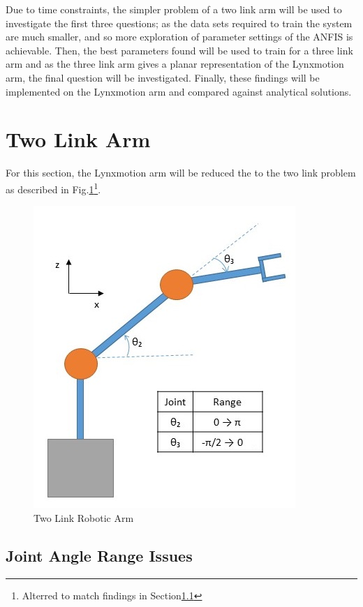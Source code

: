 \documentclass[11.5pt, twoside, a4paper]{article}
\begin{document}
 Due to time constraints, the simpler problem of a two link arm will be used to investigate the first three questions; as the data sets required to train the system are much smaller, and so more exploration of parameter settings of the ANFIS is achievable. Then, the best parameters found will be used to train for a three link arm and as the three link arm gives a planar representation of the Lynxmotion arm, the final question will be investigated. Finally, these findings will be implemented on the Lynxmotion arm and compared against analytical solutions.

\section{Two Link Arm} %

For this section, the Lynxmotion arm will be reduced the to the two link problem as described in Fig.\ref{fig:2Link}\footnote{Alterred to match findings in Section\ref{sec:elbowIssues}}. 

\begin{figure} %
\begin{center}
\includegraphics{2Link.jpg}
\caption{Two Link Robotic Arm \label{fig:2Link}}
\end{center}
\end{figure}

\subsection{Joint Angle Range Issues} \label{sec:elbowIssues}
\end{document}
